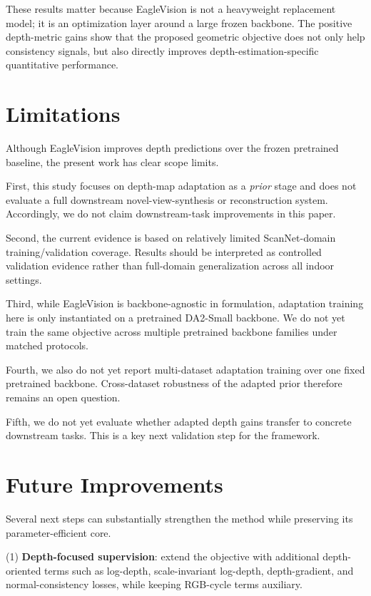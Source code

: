 \documentclass{article}
\begin{document}
These results matter because EagleVision is not a heavyweight replacement model; it is an optimization layer around a large frozen backbone. The positive depth-metric gains show that the proposed geometric objective does not only help consistency signals, but also directly improves depth-estimation-specific quantitative performance.

\section{Limitations}
Although EagleVision improves depth predictions over the frozen pretrained baseline, the present work has clear scope limits.

First, this study focuses on depth-map adaptation as a \emph{prior} stage and does not evaluate a full downstream novel-view-synthesis or reconstruction system. Accordingly, we do not claim downstream-task improvements in this paper.

Second, the current evidence is based on relatively limited ScanNet-domain training/validation coverage. Results should be interpreted as controlled validation evidence rather than full-domain generalization across all indoor settings.

Third, while EagleVision is backbone-agnostic in formulation, adaptation training here is only instantiated on a pretrained DA2-Small backbone. We do not yet train the same objective across multiple pretrained backbone families under matched protocols.

Fourth, we also do not yet report multi-dataset adaptation training over one fixed pretrained backbone. Cross-dataset robustness of the adapted prior therefore remains an open question.

Fifth, we do not yet evaluate whether adapted depth gains transfer to concrete downstream tasks. This is a key next validation step for the framework.

\section{Future Improvements}
Several next steps can substantially strengthen the method while preserving its parameter-efficient core.

(1) \textbf{Depth-focused supervision}: extend the objective with additional depth-oriented terms such as log-depth, scale-invariant log-depth, depth-gradient, and normal-consistency losses, while keeping RGB-cycle terms auxiliary.
\end{document}
